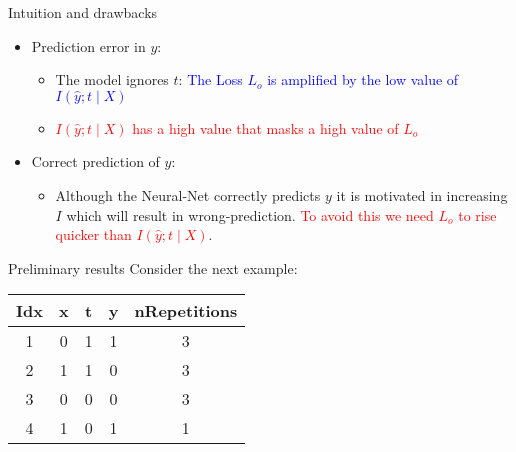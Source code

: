 \documentclass{beamer}
\begin{document}
\begin{frame}{Intuition and drawbacks}
    \begin{itemize}
        \item<1-> Prediction error in $y$:
            \begin{itemize}
                \item<2-> The model ignores $t$: \textcolor{blue}{The Loss $L_o$ is amplified by the low value of $I(\hat{y};t \mid X)$}
                \item<3-> \textcolor{red}{$I(\hat{y};t \mid X)$ has a high value that masks a high value of $L_o$}
            \end{itemize}
        \item<4-> Correct prediction of $y$:
            \begin{itemize}
                \item Although the Neural-Net correctly predicts $y$ it is motivated in increasing $I$ which will result in wrong-prediction. \textcolor{red}{To avoid this we need $L_o$ to rise quicker than $I(\hat{y};t \mid X)$}.
            \end{itemize}
    \end{itemize}
\end{frame}
\begin{frame}{Preliminary results}
    Consider the next example:
    \begin{center}
     \begin{tabular}{||c | c | c | c | c||}
     \hline
     Idx & x & t & y & nRepetitions \\ [0.5ex] 
     \hline\hline
     1 & 0 & 1 & 1 & 3 \\ 
     \hline
     2 & 1 & 1 & 0 & 3 \\
     \hline
     3 & 0 & 0 & 0 & 3 \\
     \hline
     4 & 1 & 0 & 1 & 1 \\ [1ex] 
     \hline
    \end{tabular}
    \end{center}
\end{frame}
\end{document}
